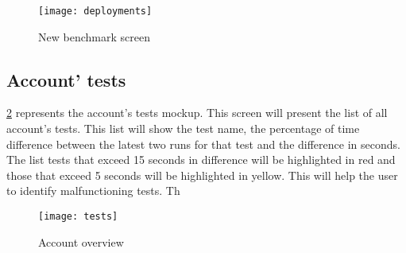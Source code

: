 \begin{figure}[ht]
  \texttt{[image: deployments]}
  \caption{New benchmark screen}
\label{fig:benchmarks_dashboard_home}
\end{figure}

\subsection{Account' tests}
\hyperref[fig:benchmarks_dashboard_tests]{\ref{fig:benchmarks_dashboard_tests}}
represents the account's tests mockup. This screen will present the list of all
account's tests. This list will show the test name, the percentage of time
difference between the latest two runs for that test and the difference in
seconds. The list tests that exceed 15 seconds in difference will be highlighted
in red and those that exceed 5 seconds will be highlighted in yellow. This will
help the user to identify malfunctioning tests. Th

\begin{figure}[ht]
\texttt{[image: tests]}
\caption{Account overview}
\label{fig:benchmarks_dashboard_tests}
\end{figure}

